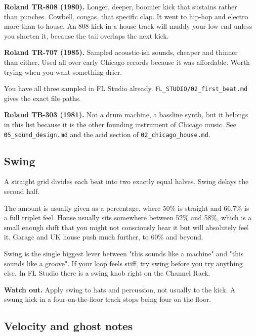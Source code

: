 \textbf{Roland TR-808 (1980).} Longer, deeper, boomier kick that sustains rather than punches.
Cowbell, congas, that specific clap. It went to hip-hop and electro more than to house. An
808 kick in a house track will muddy your low end unless you shorten it, because the tail
overlaps the next kick.

\textbf{Roland TR-707 (1985).} Sampled acoustic-ish sounds, cheaper and thinner than either.
Used all over early Chicago records because it was affordable. Worth trying when you want
something drier.

You have all three sampled in FL Studio already. \texttt{FL\_STUDIO/02\_first\_beat.md} gives the
exact file paths.

\textbf{Roland TB-303 (1981).} Not a drum machine, a bassline synth, but it belongs in this list
because it is the other founding instrument of Chicago music. See \texttt{05\_sound\_design.md} and
the acid section of \texttt{02\_chicago\_house.md}.

\subsection{Swing}\label{th03_rhythm-swing}

A straight grid divides each beat into two exactly equal halves. Swing delays the second
half.

The amount is usually given as a percentage, where 50\% is straight and 66.7\% is a full
triplet feel. House usually sits somewhere between 52\% and 58\%, which is a small enough
shift that you might not consciously hear it but will absolutely feel it. Garage and UK
house push much further, to 60\% and beyond.

Swing is the single biggest lever between "this sounds like a machine" and "this sounds like
a groove". If your loop feels stiff, try swing before you try anything else. In FL Studio
there is a swing knob right on the Channel Rack.

\begin{pitfallbox}
\textbf{Watch out.} Apply swing to hats and percussion, not usually to the kick. A swung kick in
a four-on-the-floor track stops being four on the floor.
\end{pitfallbox}

\subsection{Velocity and ghost notes}\label{th03_rhythm-velocity-and-ghost-notes}

